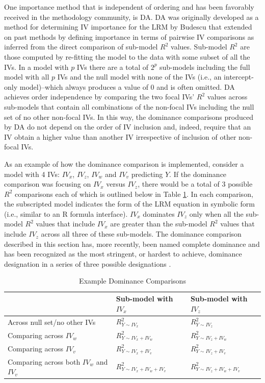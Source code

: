 \documentclass[ShortAfour,times,sageapa]{sagej}
\begin{document}
	One importance method that is independent of ordering and has been favorably received in the methodology community, is DA.
	DA was originally developed as a method for determining IV importance for the LRM by Budescu \citeyear{budescu1993dominance} that extended on past methods by defining importance in terms of pairwise IV comparisons as inferred from the direct comparison of sub-model $R^2$ values.
	Sub-model $R^2$ are those computed by re-fitting the model to the data with some subset of all the IVs.
	In a model with $p$ IVs there are a total of $2^p$ sub-models including the full model with all $p$ IVs and the null model with none of the IVs (i.e., an intercept-only model)--which always produces a value of 0 and is often omitted.
	DA achieves order independence by comparing the two focal IVs' $R^2$ values across sub-models that contain all combinations of the non-focal IVs including the null set of no other non-focal IVs.	
	In this way, the dominance comparisons produced by DA do not depend on the order of IV inclusion and, indeed, require that an IV obtain a higher value than another IV irrespective of inclusion of other non-focal IVs.
	
	As an example of how the dominance comparison is implemented, consider a model with 4 IVs: $IV_x$, $IV_z$, $IV_w$ and $IV_v$ predicting $Y$.
	If the dominance comparison was focusing on $IV_x$ versus $IV_z$, there would be a total of 3 possible $R^2$ comparisons each of which is outlined below in Table \ref{tab:exdom}.
	In each comparison, the subscripted model indicates the form of the LRM equation in symbolic form (i.e., similar to an R formula interface).
	$IV_x$ dominates $IV_z$ only when all the sub-model $R^2$ values that include $IV_x$ are greater than the sub-model $R^2$ values that include $IV_z$ across all three of these sub-models.
	The dominance comparison described in this section has, more recently, been named complete dominance and has been recognized as the most stringent, or hardest to achieve, dominance designation in a series of three possible designations \cite{azen2003dominance}.	

		\begin{table}[h!]
			\centering
			\caption{\centering Example Dominance Comparisons}
			\begin{tabular}{ l | l l }
				
				& Sub-model with $IV_x$ & Sub-model with $IV_z$ \\
				\hline
				Across null set/no other IVs & $R^2_{Y \sim IV_x}$ & $R^2_{Y \sim IV_z}$ \\
				Comparing across $IV_w$ & $R^2_{Y \sim IV_x + IV_w}$ & $R^2_{Y \sim IV_z + IV_w}$ \\
				Comparing across $IV_v$ & $R^2_{Y \sim IV_x + IV_v}$ & $R^2_{Y \sim IV_z + IV_v}$ \\
				Comparing across both $IV_w$ and $IV_v$ & $R^2_{Y \sim IV_x + IV_w + IV_v}$ & $R^2_{Y \sim IV_z + IV_w + IV_v}$ \\
				\hline
		\end{tabular}
		\label{tab:exdom}
	\end{table}
	
\end{document}
